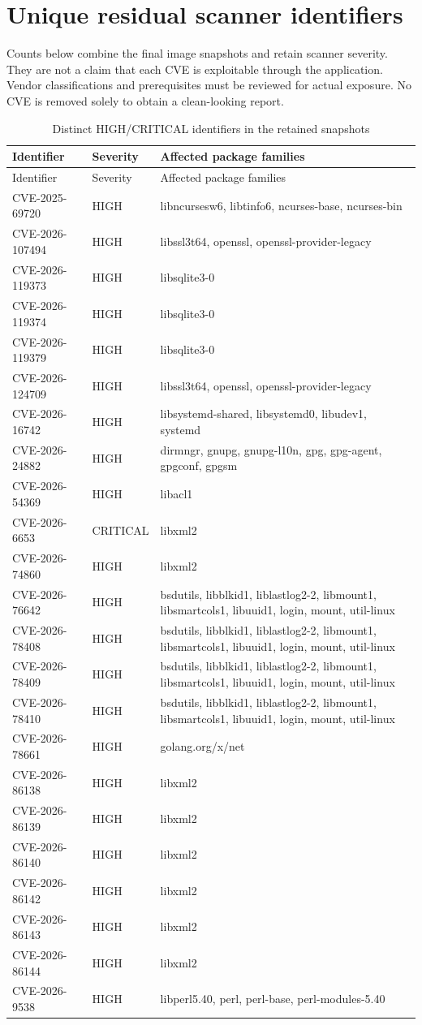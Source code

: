 \documentclass[11pt,a4paper,oneside]{report}
\begin{document}
\section{Unique residual scanner identifiers}
Counts below combine the final image snapshots and retain scanner severity. They are not a claim that each CVE is exploitable through the application. Vendor classifications and prerequisites must be reviewed for actual exposure. No CVE is removed solely to obtain a clean-looking report.
\begin{longtable}{p{.29\linewidth}p{.16\linewidth}p{.45\linewidth}}\caption{Distinct HIGH/CRITICAL identifiers in the retained snapshots}\\\toprule Identifier&Severity&Affected package families\\\midrule\endfirsthead\toprule Identifier&Severity&Affected package families\\\midrule\endhead
CVE-2025-69720&HIGH&libncursesw6, libtinfo6, ncurses-base, ncurses-bin\\
CVE-2026-107494&HIGH&libssl3t64, openssl, openssl-provider-legacy\\
CVE-2026-119373&HIGH&libsqlite3-0\\
CVE-2026-119374&HIGH&libsqlite3-0\\
CVE-2026-119379&HIGH&libsqlite3-0\\
CVE-2026-124709&HIGH&libssl3t64, openssl, openssl-provider-legacy\\
CVE-2026-16742&HIGH&libsystemd-shared, libsystemd0, libudev1, systemd\\
CVE-2026-24882&HIGH&dirmngr, gnupg, gnupg-l10n, gpg, gpg-agent, gpgconf, gpgsm\\
CVE-2026-54369&HIGH&libacl1\\
CVE-2026-6653&CRITICAL&libxml2\\
CVE-2026-74860&HIGH&libxml2\\
CVE-2026-76642&HIGH&bsdutils, libblkid1, liblastlog2-2, libmount1, libsmartcols1, libuuid1, login, mount, util-linux\\
CVE-2026-78408&HIGH&bsdutils, libblkid1, liblastlog2-2, libmount1, libsmartcols1, libuuid1, login, mount, util-linux\\
CVE-2026-78409&HIGH&bsdutils, libblkid1, liblastlog2-2, libmount1, libsmartcols1, libuuid1, login, mount, util-linux\\
CVE-2026-78410&HIGH&bsdutils, libblkid1, liblastlog2-2, libmount1, libsmartcols1, libuuid1, login, mount, util-linux\\
CVE-2026-78661&HIGH&golang.org/x/net\\
CVE-2026-86138&HIGH&libxml2\\
CVE-2026-86139&HIGH&libxml2\\
CVE-2026-86140&HIGH&libxml2\\
CVE-2026-86142&HIGH&libxml2\\
CVE-2026-86143&HIGH&libxml2\\
CVE-2026-86144&HIGH&libxml2\\
CVE-2026-9538&HIGH&libperl5.40, perl, perl-base, perl-modules-5.40\\
\bottomrule\end{longtable}
\end{document}
